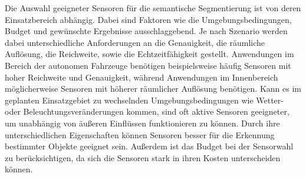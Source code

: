 Die Auswahl geeigneter Sensoren für die semantische Segmentierung ist von deren
Einsatzbereich abhängig. Dabei sind Faktoren wie die Umgebungsbedingungen,
Budget und gewünschte Ergebnisse ausschlaggebend. Je nach Szenario werden dabei
unterschiedliche Anforderungen an die Genauigkeit, die räumliche Auflösung, die
Reichweite, sowie die Echtzeitfähigkeit gestellt. Anwendungen im Bereich der
autonomen Fahrzeuge benötigen beispielsweise häufig Sensoren mit hoher
Reichweite und Genauigkeit, während Anwendungen im Innenbereich möglicherweise
Sensoren mit höherer räumlicher Auflösung benötigen. Kann es im geplanten
Einsatzgebiet zu wechselnden Umgebungsbedingungen wie Wetter- oder
Beleuchtungsveränderungen kommen, sind oft aktive Sensoren geeigneter, um
unabhängig von äußeren Einflüssen funktionieren zu können. Durch ihre
unterschiedlichen Eigenschaften können Sensoren besser für die Erkennung
bestimmter Objekte geeignet sein. Außerdem ist das Budget bei der Sensorwahl zu
berücksichtigen, da sich die Sensoren stark in ihren Kosten unterscheiden
können.\cite{20222324}
